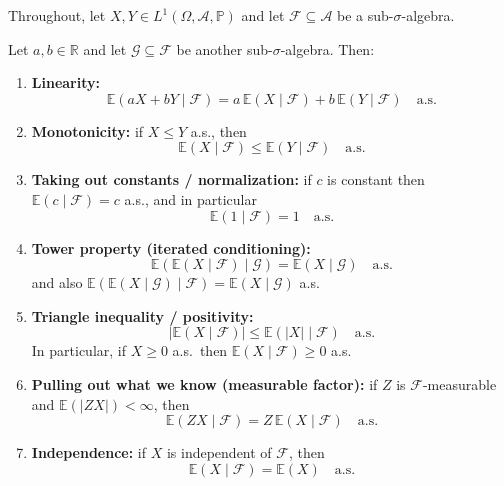 Throughout, let $X,Y\in L^{1}(\Omega,\mathcal A,\mathbb P)$ and let $\mathcal F\subseteq \mathcal A$ be a sub-$\sigma$-algebra.

\begin{theorem}
\label{thm:ce_props}
Let $a,b\in\mathbb R$ and let $\mathcal G\subseteq \mathcal F$ be another sub-$\sigma$-algebra. Then:
\begin{enumerate}
\item[(1)] \textbf{Linearity:}
\[
\mathbb E(aX+bY\mid \mathcal F)=a\,\mathbb E(X\mid\mathcal F)+b\,\mathbb E(Y\mid\mathcal F)\quad\text{a.s.}
\]

\item[(2)] \textbf{Monotonicity:} if $X\le Y$ a.s., then
\[
\mathbb E(X\mid\mathcal F)\le \mathbb E(Y\mid\mathcal F)\quad\text{a.s.}
\]

\item[(3)] \textbf{Taking out constants / normalization:}
if $c$ is constant then $\mathbb E(c\mid\mathcal F)=c$ a.s., and in particular
\[
\mathbb E(1\mid\mathcal F)=1\quad\text{a.s.}
\]

\item[(4)] \textbf{Tower property (iterated conditioning):}
\[
\mathbb E(\mathbb E(X\mid\mathcal F)\mid\mathcal G)=\mathbb E(X\mid\mathcal G)\quad\text{a.s.}
\]
and also $\mathbb E(\mathbb E(X\mid\mathcal G)\mid\mathcal F)=\mathbb E(X\mid\mathcal G)$ a.s.

\item[(5)] \textbf{Triangle inequality / positivity:}
\[
\bigl|\mathbb E(X\mid\mathcal F)\bigr|\le \mathbb E(|X|\mid\mathcal F)\quad\text{a.s.}
\]
In particular, if $X\ge 0$ a.s.\ then $\mathbb E(X\mid\mathcal F)\ge 0$ a.s.

\item[(6)] \textbf{Pulling out what we know (measurable factor):}
if $Z$ is $\mathcal F$-measurable and $\mathbb E(|ZX|)<\infty$, then
\[
\mathbb E(ZX\mid\mathcal F)=Z\,\mathbb E(X\mid\mathcal F)\quad\text{a.s.}
\]

\item[(7)] \textbf{Independence:}
if $X$ is independent of $\mathcal F$, then
\[
\mathbb E(X\mid\mathcal F)=\mathbb E(X)\quad\text{a.s.}
\]
\end{enumerate}
\end{theorem}

